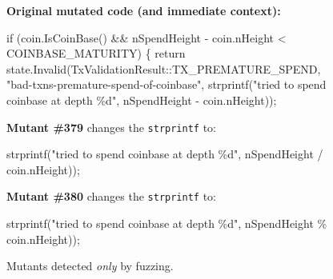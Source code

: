 \begin{sloppypar}
\begin{figure}
\raggedright

{\bf Original mutated code (and immediate context):}

\begin{code}
    if (coin.IsCoinBase() \&\& nSpendHeight - coin.nHeight < COINBASE\_MATURITY) \{
            return state.Invalid(TxValidationResult::TX\_PREMATURE\_SPEND, "bad-txns-premature-spend-of-coinbase",
                strprintf("tried to spend coinbase at depth \%d", nSpendHeight - coin.nHeight));
\end{code}

{\bf Mutant \#379} changes the {\tt strprintf} to:

\begin{code}
strprintf("tried to spend coinbase at depth \%d", nSpendHeight / coin.nHeight));
\end{code}

{\bf Mutant \#380} changes the {\tt strprintf} to:

\begin{code}
strprintf("tried to spend coinbase at depth \%d", nSpendHeight \% coin.nHeight));
\end{code}
\caption{Mutants detected \emph{only} by fuzzing.}
\label{mkills}
\end{figure}


\end{sloppypar}
